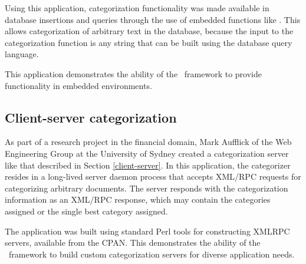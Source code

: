 Using this application, categorization functionality was made
available in database insertions and queries through the use of
embedded functions like .  This allows
categorization of arbitrary text in the database, because the input to
the categorization function is any string that can be built using the
database query language.

This application demonstrates the ability of the \aicat\ framework to
provide functionality in embedded environments.

\subsection{Client-server categorization}

As part of a research project in the financial domain, Mark Aufflick
of the Web Engineering Group at the University of Sydney created a
categorization server like that described in Section
\ref{client-server}.  In this application, the categorizer resides in
a long-lived server daemon process that accepts XML/RPC requests for
categorizing arbitrary documents.  The server responds with the
categorization information as an XML/RPC response, which may contain
the categories assigned or the single best category assigned.

The application was built using standard Perl tools for constructing
XML\discretionary{/}{}{/}RPC servers, available from the CPAN.  This demonstrates the
ability of the \aicat\ framework to build custom categorization
servers for diverse application needs.
